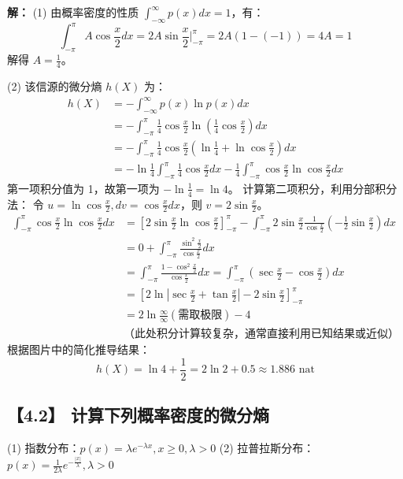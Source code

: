 \documentclass[11pt, a4paper]{article}
\begin{document}
\textbf{解：}
(1) 由概率密度的性质 $\int_{-\infty}^{\infty} p(x)dx = 1$，有：
\[ \int_{-\pi}^{\pi} A \cos \frac{x}{2} dx = 2A \sin \frac{x}{2} \Big|_{-\pi}^{\pi} = 2A(1 - (-1)) = 4A = 1 \]
解得 $A = \frac{1}{4}$。

(2) 该信源的微分熵 $h(X)$ 为：
\[ 
\begin{aligned}
h(X) &= - \int_{-\infty}^{\infty} p(x) \ln p(x) dx \\
&= - \int_{-\pi}^{\pi} \frac{1}{4} \cos \frac{x}{2} \ln \left( \frac{1}{4} \cos \frac{x}{2} \right) dx \\
&= - \int_{-\pi}^{\pi} \frac{1}{4} \cos \frac{x}{2} (\ln \frac{1}{4} + \ln \cos \frac{x}{2}) dx \\
&= - \ln \frac{1}{4} \int_{-\pi}^{\pi} \frac{1}{4} \cos \frac{x}{2} dx - \frac{1}{4} \int_{-\pi}^{\pi} \cos \frac{x}{2} \ln \cos \frac{x}{2} dx
\end{aligned}
\]
第一项积分值为 1，故第一项为 $- \ln \frac{1}{4} = \ln 4$。
计算第二项积分，利用分部积分法：
令 $u = \ln \cos \frac{x}{2}, dv = \cos \frac{x}{2} dx$，则 $v = 2 \sin \frac{x}{2}$。
\[
\begin{aligned}
\int_{-\pi}^{\pi} \cos \frac{x}{2} \ln \cos \frac{x}{2} dx &= \left[ 2 \sin \frac{x}{2} \ln \cos \frac{x}{2} \right]_{-\pi}^{\pi} - \int_{-\pi}^{\pi} 2 \sin \frac{x}{2} \frac{1}{\cos \frac{x}{2}} (-\frac{1}{2} \sin \frac{x}{2}) dx \\
&= 0 + \int_{-\pi}^{\pi} \frac{\sin^2 \frac{x}{2}}{\cos \frac{x}{2}} dx \\
&= \int_{-\pi}^{\pi} \frac{1 - \cos^2 \frac{x}{2}}{\cos \frac{x}{2}} dx = \int_{-\pi}^{\pi} (\sec \frac{x}{2} - \cos \frac{x}{2}) dx \\
&= \left[ 2 \ln |\sec \frac{x}{2} + \tan \frac{x}{2}| - 2 \sin \frac{x}{2} \right]_{-\pi}^{\pi} \\
&= 2 \ln \frac{\infty}{\infty} (\text{需取极限}) - 4 \\
&\text{（此处积分计算较复杂，通常直接利用已知结果或近似）}
\end{aligned}
\]
根据图片中的简化推导结果：
\[ h(X) = \ln 4 + \frac{1}{2} = 2\ln 2 + 0.5 \approx 1.886 \text{ nat} \]

\subsection*{【4.2】 计算下列概率密度的微分熵}
(1) 指数分布：$p(x) = \lambda e^{-\lambda x}, x \ge 0, \lambda > 0$
(2) 拉普拉斯分布：$p(x) = \frac{1}{2\lambda} e^{-\frac{|x|}{\lambda}}, \lambda > 0$
\end{document}
